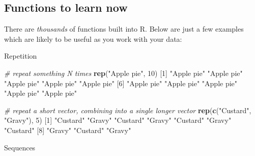 \documentclass[]{article}
\newenvironment{Shaded}{\begin{snugshade}}{\end{snugshade}}
\newcommand{\CommentTok}[1]{\textcolor[rgb]{0.56,0.35,0.01}{\textit{#1}}}
\newcommand{\DecValTok}[1]{\textcolor[rgb]{0.00,0.00,0.81}{#1}}
\newcommand{\KeywordTok}[1]{\textcolor[rgb]{0.13,0.29,0.53}{\textbf{#1}}}
\newcommand{\NormalTok}[1]{#1}
\newcommand{\StringTok}[1]{\textcolor[rgb]{0.31,0.60,0.02}{#1}}
\begin{document}
\hypertarget{functions-to-learn-now}{%
\subsection*{Functions to learn now}\label{functions-to-learn-now}}

There are \emph{thousands} of functions built into R. Below are just a few examples
which are likely to be useful as you work with your data:

Repetition

\begin{Shaded}
\begin{Highlighting}[]
\CommentTok{# repeat something N times}
\KeywordTok{rep}\NormalTok{(}\StringTok{"Apple pie"}\NormalTok{, }\DecValTok{10}\NormalTok{)}
\NormalTok{ [}\DecValTok{1}\NormalTok{] }\StringTok{"Apple pie"} \StringTok{"Apple pie"} \StringTok{"Apple pie"} \StringTok{"Apple pie"} \StringTok{"Apple pie"}
\NormalTok{ [}\DecValTok{6}\NormalTok{] }\StringTok{"Apple pie"} \StringTok{"Apple pie"} \StringTok{"Apple pie"} \StringTok{"Apple pie"} \StringTok{"Apple pie"}
\end{Highlighting}
\end{Shaded}

\begin{Shaded}
\begin{Highlighting}[]
\CommentTok{# repeat a short vector, combining into a single longer vector}
\KeywordTok{rep}\NormalTok{(}\KeywordTok{c}\NormalTok{(}\StringTok{"Custard"}\NormalTok{, }\StringTok{"Gravy"}\NormalTok{), }\DecValTok{5}\NormalTok{)}
\NormalTok{ [}\DecValTok{1}\NormalTok{] }\StringTok{"Custard"} \StringTok{"Gravy"}   \StringTok{"Custard"} \StringTok{"Gravy"}   \StringTok{"Custard"} \StringTok{"Gravy"}   \StringTok{"Custard"}
\NormalTok{ [}\DecValTok{8}\NormalTok{] }\StringTok{"Gravy"}   \StringTok{"Custard"} \StringTok{"Gravy"}  
\end{Highlighting}
\end{Shaded}

Sequences
\end{document}
